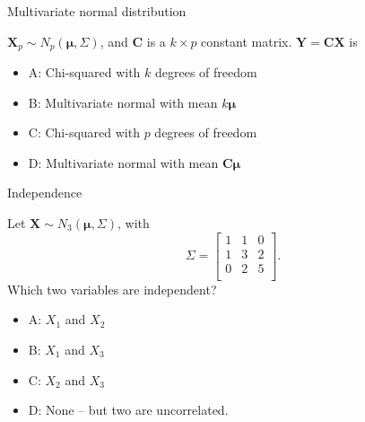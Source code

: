 \documentclass[ignorenonframetext,]{beamer}
\providecommand{\tightlist}{%
  \setlength{\itemsep}{0pt}\setlength{\parskip}{0pt}}
\begin{document}
\begin{frame}

\begin{block}{Multivariate normal distribution}

\(\mathbf{X}_p \sim N_p(\mathbf{\mu},\Sigma)\), and \(\mathbf{C}\) is a
\(k \times p\) constant matrix. \(\mathbf{Y}=\mathbf{C}\mathbf{X}\) is

\begin{itemize}
\tightlist
\item
  A: Chi-squared with \(k\) degrees of freedom
\item
  B: Multivariate normal with mean \(k\mathbf{\mu}\)
\item
  C: Chi-squared with \(p\) degrees of freedom
\item
  D: Multivariate normal with mean \(\mathbf{C}\mathbf{\mu}\)
\end{itemize}

\end{block}

\end{frame}

\begin{frame}

\begin{block}{Independence}

Let \(\mathbf{X}\sim N_3(\mathbf{\mu},\Sigma)\), with
\[\Sigma= \left[     
\begin{array}{ccc} 1&1&0\\
      1&3&2\\
      0&2&5\\
          \end{array}
          \right].\] Which two variables are independent?

\begin{itemize}
\tightlist
\item
  A: \(X_1\) and \(X_2\)
\item
  B: \(X_1\) and \(X_3\)
\item
  C: \(X_2\) and \(X_3\)
\item
  D: None -- but two are uncorrelated.
\end{itemize}

\end{block}

\end{frame}
\end{document}
